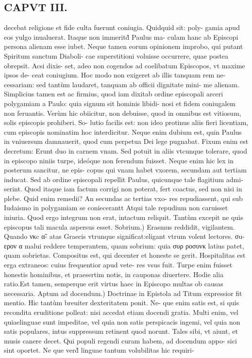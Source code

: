 \documentclass{article}
\begin{document}
\begin{pages}
\section*{CAPVT III. }
\marginpar{[ p.33 ]}\pstart decebat religione et fide culta fuerunt coniugia. Quidquid sit: poly- gamia apud eos yulgo inualuerat. Itaque non immeritd̀ Paulus ma- culam hanc ab Episcopi persona alienam esse iubet. Neque tamen eorum opinionem improbo, qui putant Spiritum sanctum Diaboli- cae superstitioni voluisse occurrere, quae postea obrepsit. Acsi dixis- set, adeo non cogendos ad coelibatum Episcopos, vt maxime ipsos de- ceat coniugium. Hoc modo non exigeret ab illis tanquam rem ne- cessariam: sed tantùm laudaret, tanquam ab officii dignitate mini- me alienam. Simplicius tamen est ac firmius, quod iam dixitab ordine episcopali arceri polygamiam a Paulo: quia signum sit hominis libidi- nosi et fidem coniugalem non feruantis. Verùm hic obiicitur, non debuisse, quod in omnibus est vitiosum, solis episcopis prohiberi. So- lutio facilis est: non ideo protinus aliis fieri licentiam, cum episcopis nominatim hoc interdicitur. Neque enim dubium est, quin Paulus in vniuersum damnauerit, quod cum perpetua Dei lege pugnabat. Fixum enim est decretum: Erunt duo in carnem vnam. Sed potuit in aliis vtcunque tolerare, quod in episcopo niniis turpe, ideóque non ferendum fuisset. Neque enim hic lex in posterum sancitur, ne epis- copus qui vnam habet vxorem, secundam aut tertiam inducat. Sed ab ordine episcopali repellit Paulus, quicunque tale flagitium admi- serint. Quod itaque iam factum corrigi non poterat, fert coactus, sed non nisi in plebe. Quid enim remedii? An secundas ac tertias vxo- res repudiassent, qui sub Iudaismo in polygamiam se coniecerantt Atqui tale repudium non caruisset iniuria. Quod ergo integrum non erat, intactum reliquit. Tantùm excepit ne quis episcopus tali macula aspersus esset.  \pend\pstart Sobrium.) Erasmus reddidit, vigilantem. Quando νκc α̃- atas Graecis vtrunque significat:eligant vtrum volent lectores. σu- ερον α malui reddere temperantem, quam sobrium: quia συρ ροσυνκ latius patet, quam sobrietas. Compositus est, qui decenter et honeste se gerit. Hospitalitas est erga extraneos: cuius frequentior apud vete- res vsus fuit. Turpe enim fuisset honestis hominibus, et praesertim notis, in cauponas diuertere. Hodie alia ratio.Est tamen, semperque erit virtus haec in Episcopo multas ob causas necessaria.  \pend\pstart Aptum ad docendum.) Doctrinae in Epistola ad Titum expressior fit mentio. Hic tantùm breuiter dexteritatem ponit. Ne- que enim satis est, si quis recondita eruditione polleat: nisi accedat etiam docendi gratia. Multi enim, vel quiaelinguae sunt impeditae, vel quia non satis perspicacis ingemi, vel quia non satis populares, intus suppressum retinent quod norunt. Tales sibi, vt aiunt, et musis canere decet. Qui populi regendi curam habem, ad docendum appo- sici sint oportet. Ne que verd̀ linguae tantum volubilitas hic requiri-  \pend

\end{pages}
\end{document}
